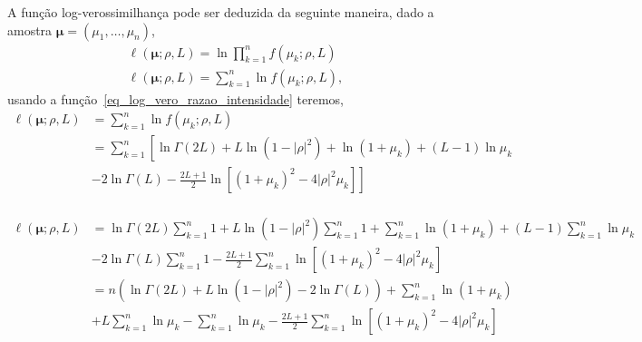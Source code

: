 \documentclass[12pt]{article}
\begin{document}
A função log-verossimilhança pode ser deduzida da seguinte maneira, dado a amostra $\bm\mu = (\mu_1,\dots,\mu_n)$, 
\begin{equation}\nonumber
\begin{split}
  \ell(\bm \mu;\rho, L)=\ln\prod_{k=1}^{n}f(\mu_k;\rho,L)\\
  \ell(\bm \mu;\rho, L)=\sum_{k=1}^{n}\ln f(\mu_k;\rho,L),
 \end{split}
 \end{equation}
usando a função~\eqref{eq_log_vero_razao_intensidade} teremos,
\begin{equation}\nonumber
\begin{split}
    \ell(\bm \mu;\rho, L)&=\sum_{k=1}^{n}\ln f(\mu_k;\rho, L)\\
                         &=\sum_{k=1}^{n}\left[\ln\Gamma(2L) +L\ln(1-|\rho|^2)+\ln(1+\mu_k)+(L-1)\ln\mu_k\right.\\
                         &-\left.2\ln\Gamma(L)-\frac{2L+1}{2}\ln\left[(1+\mu_k)^2-4|\rho|^2\mu_k\right]\right]\\
 \end{split}
 \end{equation}
 
 \begin{equation}\nonumber
\begin{split} 
    \ell(\bm \mu;\rho, L)&=\ln\Gamma(2L)\sum_{k=1}^{n} 1+L\ln(1-|\rho|^2)\sum_{k=1}^{n} 1+\sum_{k=1}^{n}\ln(1+\mu_k)+(L-1)\sum_{k=1}^{n}\ln\mu_k\\
                         &-2\ln\Gamma(L)\sum_{k=1}^{n} 1-\frac{2L+1}{2}\sum_{k=1}^{n}\ln\left[(1+\mu_k)^2-4|\rho|^2\mu_k\right]\\
                         &=n\left(\ln\Gamma(2L)+L\ln(1-|\rho|^2)-2\ln\Gamma(L)\right)+\sum_{k=1}^{n}\ln(1+\mu_k)\\
                         &+L\sum_{k=1}^{n}\ln\mu_k-\sum_{k=1}^{n}\ln\mu_k-\frac{2L+1}{2}\sum_{k=1}^{n} \ln\left[(1+\mu_k)^2-4|\rho|^2\mu_k\right]\\
\end{split}
\end{equation}
 
\end{document}
